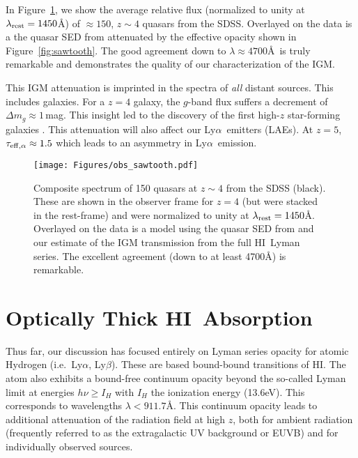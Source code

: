\documentclass[graybox]{svmult}
\newcommand{\HI}{H{\sc I}}
\def\lya{Ly$\alpha$}
\def\lyb{Ly$\beta$}
\begin{document}
In Figure~\ref{fig:stack_saw}, we show the average 
relative flux (normalized to unity at $\lambda_{\rm rest} = 1450$\AA)
of $\approx 150$, $z \sim 4$ quasars from the SDSS.
Overlayed on the data is a the quasar SED from 
\cite{telfer02} attenuated by the effective opacity
shown in Figure~\ref{fig:sawtooth}.
The good agreement down to $\lambda \approx 4700$\AA\
is truly remarkable and demonstrates the quality of our
characterization of the IGM.

This IGM attenuation 
is imprinted in the spectra of {\it all} distant sources.
This includes galaxies.  
For a $z=4$ galaxy, the $g$-band flux suffers a decrement
of $\Delta m_g \approx 1$\,mag.
This insight  led to the discovery
of the first high-$z$ star-forming galaxies 
\cite{mad95,sgp+96,lkg+97}.
This attenuation will also affect our \lya\ emitters (LAEs).
At $z=5$, $\tau_{\rm eff, \alpha} \approx 1.5$ 
which leads to an asymmetry in \lya\ emission. 


%
\begin{figure}[b]
\sidecaption
\texttt{[image: Figures/obs\_sawtooth.pdf]}
%
%
\caption{Composite spectrum of 150 quasars at $z \sim 4$
from the SDSS (black).  These are shown in the observer
frame for $z=4$ (but were stacked in the rest-frame)
and were normalized to unity at $\lambda_{\rm rest} = 1450$\AA.
Overlayed on the data is a model using the quasar SED
from \cite{telfer02} and our estimate of the IGM transmission
from the full \HI\ Lyman series.  The excellent agreement
(down to at least 4700\AA) is remarkable.
}
\label{fig:stack_saw}       %
\end{figure}

\section{Optically Thick \HI\ Absorption}

Thus far, our discussion has focused entirely on Lyman
series opacity for atomic Hydrogen (i.e.\ \lya, \lyb).
These are based bound-bound transitions of \HI.
The atom also exhibits a bound-free
continuum opacity beyond the so-called Lyman limit
at energies $h \nu \ge I_H$ with
$I_H$ the ionization energy (13.6eV).  This corresponds
to wavelengths $\lambda < 911.7$\AA.
This continuum opacity leads to additional attenuation
of the radiation field at high $z$, both for 
ambient radiation (frequently referred to as the
extragalactic UV background or EUVB) and 
for individually observed sources.
\end{document}
